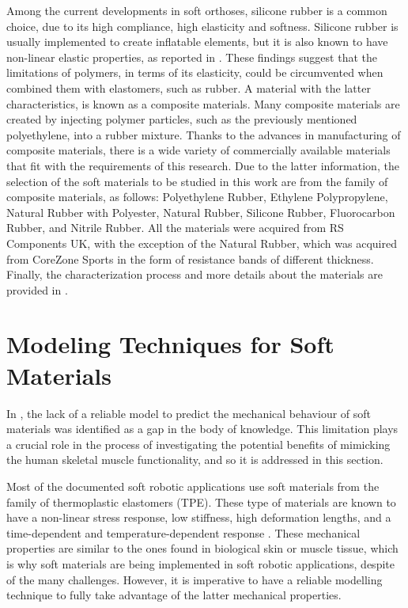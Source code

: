 Among the current developments in soft orthoses, silicone rubber is a common choice, due to its high compliance, high elasticity and softness. Silicone rubber is usually implemented to create inflatable elements, but it is also known to have non-linear elastic properties, as reported in \cite{roylance2008mechanical}. These findings suggest that the limitations of polymers, in terms of its elasticity, could be circumvented when combined them with elastomers, such as rubber. A material with the latter characteristics, is known as a composite materials. Many composite materials are created by injecting polymer particles, such as the previously mentioned polyethylene, into a rubber mixture. Thanks to the advances in manufacturing of composite materials, there is a wide variety of commercially available materials that fit with the requirements of this research. Due to the latter information, the selection of the soft materials to be studied in this work are from the family of composite materials, as follows: Polyethylene Rubber, Ethylene Polypropylene, Natural Rubber with Polyester, Natural Rubber, Silicone Rubber, Fluorocarbon Rubber, and Nitrile Rubber. All the materials were acquired from RS Components UK\textregistered{}, with the exception of the Natural Rubber, which was acquired from CoreZone Sports\textregistered{} in the form of resistance bands of different thickness. Finally, the characterization process and more details about the materials are provided in .

\newpage

\section{Modeling Techniques for Soft Materials} \label{sec:modelingTechniques}

In , the lack of a reliable model to predict the mechanical behaviour of soft materials was identified as a gap in the body of knowledge. This limitation plays a crucial role in the process of investigating the potential benefits of mimicking the human skeletal muscle functionality, and so it is addressed in this section. 

Most of the documented soft robotic applications use soft materials from the family of thermoplastic elastomers (TPE). These type of materials are known to have a non-linear stress response, low stiffness, high deformation lengths, and a time-dependent and temperature-dependent response \cite{Bauman2008}. These mechanical properties are similar to the ones found in biological skin or muscle tissue, which is why soft materials are being implemented in soft robotic applications, despite of the many challenges. However, it is imperative to have a reliable modelling technique to fully take advantage of the latter mechanical properties.

